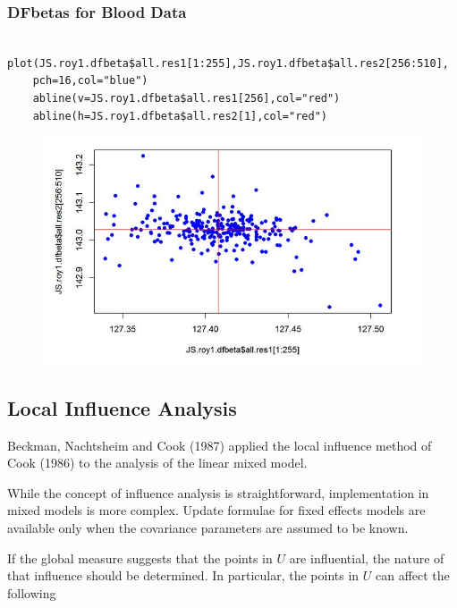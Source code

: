 \documentclass[Main.tex]{subfiles}
\begin{document}
\subsubsection{DFbetas for Blood Data}
\begin{framed}
	\begin{verbatim}
	plot(JS.roy1.dfbeta$all.res1[1:255],JS.roy1.dfbeta$all.res2[256:510],
	pch=16,col="blue")
	abline(v=JS.roy1.dfbeta$all.res1[256],col="red")
	abline(h=JS.roy1.dfbeta$all.res2[1],col="red")
	\end{verbatim}
\end{framed}
\begin{figure}
	\centering
	\includegraphics[width=0.7\linewidth]{images/dfbetas-JS-ROY}
	\caption{}
	\label{fig:dfbetas-JS-ROY}
\end{figure}







\newpage
\subsection{Local Influence Analysis}



Beckman, Nachtsheim and Cook (1987)  applied the local influence method of Cook (1986) to the analysis of the linear mixed model.

While the concept of influence analysis is straightforward, implementation in mixed models is more complex. Update formulae for fixed effects models are available only when the covariance parameters are assumed to be known.

If the global measure suggests that the points in $U$ are influential, the nature of that influence should be determined. In particular, the points in $U$ can affect the following
\end{document}
